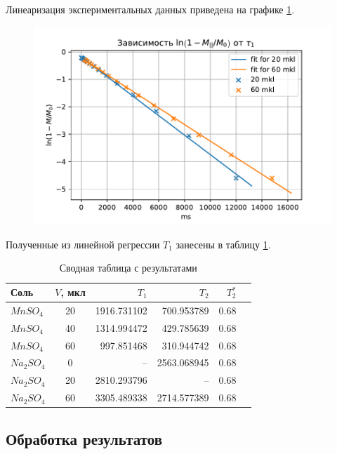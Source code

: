 Линеаризация экспериментальных данных приведена на графике \ref{fig:nat1reg}.
	
\begin{figure}[h]
	\hspace{-5em}
	\includegraphics[width=1.2\linewidth]{data/Na_T_1_reg}
	\caption{}
	\label{fig:nat1reg}
\end{figure}

Полученные из линейной регрессии $ T_1 $ занесены в таблицу \ref{table:all-T}.


\begin{table}[ht]
	\caption{Сводная таблица с результатами}
	\label{table:all-T}
	\centering
	\begin{tabular}{|l|c|r|r|r|r|}
		\toprule
		Соль &     $V$, мкл &          $T_1$ &          $T_2$ &  $T_2^*$ \\
		\midrule
		$MnSO_4$  	&  20 &  1916.731102 &   700.953789 &  0.68 \\
		$MnSO_4$  	&  40 &  1314.994472 &   429.785639 &  0.68 \\
		$MnSO_4$ 	&  60 &   997.851468 &   310.944742 &  0.68 \\
		$Na_2 SO_4$ &   0 &          --	 &  2563.068945 &  0.68 \\
		$Na_2 SO_4$ &  20 &  2810.293796 &          --  &  0.68 \\
		$Na_2 SO_4$ &  60 &  3305.489338 &  2714.577389 &  0.68 \\
		\bottomrule
	\end{tabular}
\end{table}

\subsection{Обработка результатов}